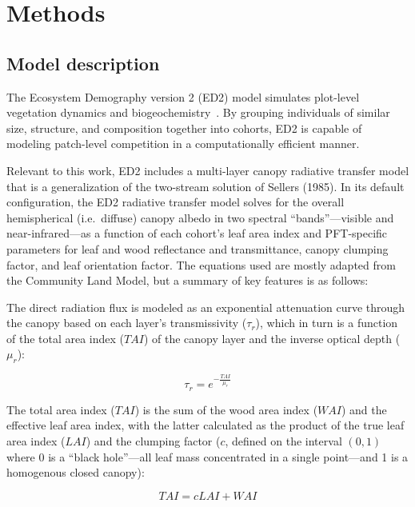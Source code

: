 \section{Methods}

\subsection{Model description}

The Ecosystem Demography version 2 (ED2) model simulates plot-level vegetation dynamics and biogeochemistry~\cite{Moorcroft_2001_ED,Medvigy_2009_ED2}.
By grouping individuals of similar size, structure, and composition together into cohorts, ED2 is capable of modeling patch-level competition in a computationally efficient manner.

Relevant to this work, ED2 includes a multi-layer canopy radiative transfer model that is a generalization of the two-stream solution of Sellers (1985). \nocite{SELLERS_1985_canopy}
In its default configuration, the ED2 radiative transfer model solves for the overall hemispherical (i.e.\ diffuse) canopy albedo in two spectral ``bands''---visible and near-infrared---as a function of each cohort's leaf area index and PFT-specific parameters for leaf and wood reflectance and transmittance, canopy clumping factor, and leaf orientation factor.
The equations used are mostly adapted from the Community Land Model\cite{clm45_note}, but a summary of key features is as follows:

The direct radiation flux is modeled as an exponential attenuation curve through the canopy based on each layer's transmissivity ($\tau_r$),
which in turn is a function of the total area index ($TAI$) of the canopy layer and the inverse optical depth ($\mu_r$):

\begin{equation}\label{eq:tau_r}
  \tau_r = e ^ {- \frac{TAI}{\mu_r}}
\end{equation}

The total area index ($TAI$) is the sum of the wood area index ($WAI$) and the effective leaf area index, with the latter calculated as the product of the true leaf area index ($LAI$) and the clumping factor ($c$, defined on the interval $(0, 1)$ where 0 is a ``black hole''---all leaf mass concentrated in a single point---and 1 is a homogenous closed canopy):

\begin{equation}\label{eq:tai}
  TAI = c LAI + WAI
\end{equation}

